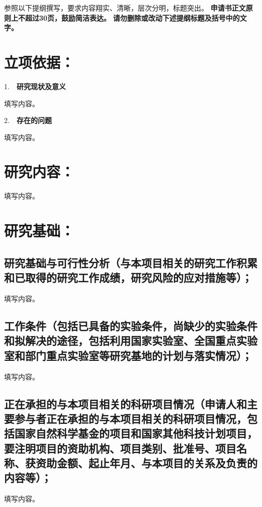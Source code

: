\documentclass[GP]{nsfc}
\newcommand{\msection}[1]{%
  \par\vspace{5pt}%
  {\noindent\sffamily\songti\zihao{-4} #1}%
  \par\vspace{2pt}%
  \setcounter{subsection}{0}%
}
\begin{document}
\maketitle

{\kaishu\enkai\fontsize{14pt}{15pt}\selectfont
参照以下提纲撰写，要求内容翔实、清晰，层次分明，标题突出。
\textbf{\color{NSFCred}申请书正文原则上不超过30页，鼓励简洁表达。}
\textbf{\color{NSFCblue}请勿删除或改动下述提纲标题及括号中的文字。}\par
\vspace{-3pt}}

\chapter{\textbf{立项依据：}}

\msection{1.~~\textbf{研究现状及意义}}
填写内容。

\msection{2.~~\textbf{存在的问题}}
填写内容。

\chapter{\textbf{研究内容：}}
填写内容。

\renewcommand{\bibname}{\color{black}\normalfont\normalsize\bfseries 参考文献}


\clearpage
\chapter{\textbf{研究基础：}}

\section{\textbf{研究基础与可行性分析}（与本项目相关的研究工作积累和已取得的研究工作成绩，研究风险的应对措施等）；}
填写内容。

\section{\textbf{工作条件}（包括已具备的实验条件，尚缺少的实验条件和拟解决的途径，包括利用国家实验室、全国重点实验室和部门重点实验室等研究基地的计划与落实情况）；}
填写内容。

\section{\textbf{正在承担的与本项目相关的科研项目情况}（申请人和主要参与者正在承担的与本项目相关的科研项目情况，包括国家自然科学基金的项目和国家其他科技计划项目，要注明项目的资助机构、项目类别、批准号、项目名称、获资助金额、起止年月、与本项目的关系及负责的内容等）；}
填写内容。
\end{document}
